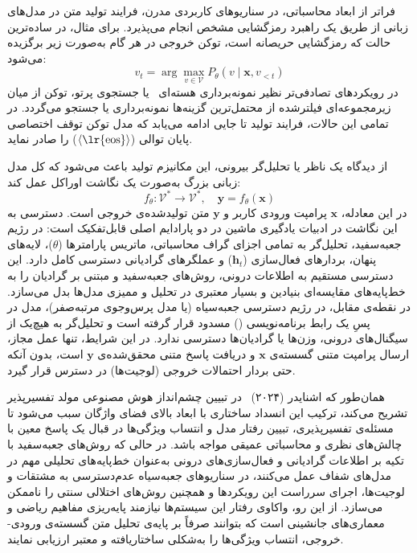 فراتر از ابعاد محاسباتی، در سناریوهای کاربردی مدرن، فرایند تولید متن در مدل‌های زبانی از طریق یک راهبرد رمزگشایی مشخص انجام می‌پذیرد. برای مثال، در ساده‌ترین حالت که رمزگشایی حریصانه است، توکن خروجی در هر گام به‌صورت زیر برگزیده می‌شود:
\begin{equation}\label{eq:chap2_greedy}
    v_t = \arg\max_{v \in \mathcal{V}} P_\theta(v \mid \mathbf{x}, v_{<t})
\end{equation}
در رویکردهای تصادفی‌تر نظیر نمونه‌برداری هسته‌ای~\cite{holtzman2020curious} یا جستجوی پرتو، توکن از میان زیرمجموعه‌ای فیلترشده از محتمل‌ترین گزینه‌ها نمونه‌برداری یا جستجو می‌گردد. در تمامی این حالات، فرایند تولید تا جایی ادامه می‌یابد که مدل توکن توقف اختصاصی پایان توالی ($\langle\text{\lr{eos}}\rangle$) را صادر نماید.

از دیدگاه یک ناظر یا تحلیل‌گر بیرونی، این مکانیزم تولید باعث می‌شود که کل مدل زبانی بزرگ به‌صورت یک نگاشت اوراکل عمل کند:
\begin{equation}\label{eq:chap2_blackbox}
    f_\theta: \mathcal{V}^* \to \mathcal{V}^*, \quad \mathbf{y} = f_\theta(\mathbf{x})
\end{equation}
در این معادله، $\mathbf{x}$ پرامپت ورودی کاربر و $\mathbf{y}$ متن تولیدشده‌ی خروجی است. دسترسی به این نگاشت در ادبیات یادگیری ماشین در دو پارادایم اصلی قابل‌تفکیک است:
در رژیم جعبه‌سفید، تحلیل‌گر به تمامی اجزای گراف محاسباتی، ماتریس پارامترها ($\theta$)، لایه‌های پنهان، بردارهای فعال‌سازی ($\mathbf{h}_t$) و عملگرهای گرادیانی دسترسی کامل دارد. این دسترسی مستقیم به اطلاعات درونی، روش‌های جعبه‌سفید و مبتنی بر گرادیان را به خط‌پایه‌های مقایسه‌ای بنیادین و بسیار معتبری در تحلیل و ممیزی مدل‌ها بدل می‌سازد. در نقطه‌ی مقابل، در رژیم دسترسی جعبه‌سیاه (یا مدل پرس‌وجوی مرتبه‌صفر)، مدل در پسِ یک رابط برنامه‌نویسی () مسدود قرار گرفته است و تحلیل‌گر به هیچ‌یک از سیگنال‌های درونی، وزن‌ها یا گرادیان‌ها دسترسی ندارد. در این شرایط، تنها عمل مجاز، ارسال پرامپت متنی گسسته‌ی $\mathbf{x}$ و دریافت پاسخ متنی محقق‌شده‌ی $\mathbf{y}$ است، بدون آنکه حتی بردار احتمالات خروجی (لوجیت‌ها) در دسترس قرار گیرد.

همان‌طور که اشنایدر (۲۰۲۴)~\cite{schneider2024explainable} در تبیین چشم‌انداز هوش مصنوعی مولد تفسیرپذیر تشریح می‌کند، ترکیب این انسداد ساختاری با ابعاد بالای فضای واژگان سبب می‌شود تا مسئله‌ی تفسیرپذیری، تبیین رفتار مدل و انتساب ویژگی‌ها در قبال یک پاسخ معین با چالش‌های نظری و محاسباتی عمیقی مواجه باشد. در حالی که روش‌های جعبه‌سفید با تکیه بر اطلاعات گرادیانی و فعال‌سازی‌های درونی به‌عنوان خط‌پایه‌های تحلیلی مهم در مدل‌های شفاف عمل می‌کنند، در سناریوهای جعبه‌سیاه عدم‌دسترسی به مشتقات و لوجیت‌ها، اجرای سرراست این رویکردها و همچنین روش‌های اختلالی سنتی را ناممکن می‌سازد. از این رو، واکاوی رفتار این سیستم‌ها نیازمند پایه‌ریزی مفاهیم ریاضی و معماری‌های جانشینی است که بتوانند صرفاً بر پایه‌ی تحلیل متن گسسته‌ی ورودی-خروجی، انتساب ویژگی‌ها را به‌شکلی ساختاریافته و معتبر ارزیابی نمایند.



